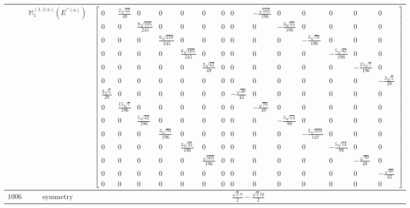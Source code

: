 \documentclass[fleqn,8pt,landscape]{jsarticle}
\begin{document}
\begin{longtable}{ccc}
$  $ & $ \mathbb{M}_{1}^{(1,1;a)}(E^{\prime\prime(a)}) $ & $ \begin{bmatrix} 0 & \frac{2 \sqrt{42}}{49} & 0 & 0 & 0 & 0 & 0 & 0 & - \frac{\sqrt{105}}{196} & 0 & 0 & 0 & 0 & 0 \\ 0 & 0 & \frac{8 \sqrt{105}}{245} & 0 & 0 & 0 & 0 & 0 & 0 & - \frac{3 \sqrt{35}}{196} & 0 & 0 & 0 & 0 \\ 0 & 0 & 0 & \frac{6 \sqrt{210}}{245} & 0 & 0 & 0 & 0 & 0 & 0 & - \frac{3 \sqrt{70}}{196} & 0 & 0 & 0 \\ 0 & 0 & 0 & 0 & \frac{8 \sqrt{105}}{245} & 0 & 0 & 0 & 0 & 0 & 0 & - \frac{5 \sqrt{42}}{196} & 0 & 0 \\ 0 & 0 & 0 & 0 & 0 & \frac{2 \sqrt{42}}{49} & 0 & 0 & 0 & 0 & 0 & 0 & - \frac{15 \sqrt{7}}{196} & 0 \\ 0 & 0 & 0 & 0 & 0 & 0 & 0 & 0 & 0 & 0 & 0 & 0 & 0 & - \frac{3 \sqrt{5}}{28} \\ \frac{3 \sqrt{5}}{28} & 0 & 0 & 0 & 0 & 0 & 0 & - \frac{\sqrt{30}}{42} & 0 & 0 & 0 & 0 & 0 & 0 \\ 0 & \frac{15 \sqrt{7}}{196} & 0 & 0 & 0 & 0 & 0 & 0 & - \frac{\sqrt{70}}{49} & 0 & 0 & 0 & 0 & 0 \\ 0 & 0 & \frac{5 \sqrt{42}}{196} & 0 & 0 & 0 & 0 & 0 & 0 & - \frac{5 \sqrt{14}}{98} & 0 & 0 & 0 & 0 \\ 0 & 0 & 0 & \frac{3 \sqrt{70}}{196} & 0 & 0 & 0 & 0 & 0 & 0 & - \frac{2 \sqrt{210}}{147} & 0 & 0 & 0 \\ 0 & 0 & 0 & 0 & \frac{3 \sqrt{35}}{196} & 0 & 0 & 0 & 0 & 0 & 0 & - \frac{5 \sqrt{14}}{98} & 0 & 0 \\ 0 & 0 & 0 & 0 & 0 & \frac{\sqrt{105}}{196} & 0 & 0 & 0 & 0 & 0 & 0 & - \frac{\sqrt{70}}{49} & 0 \\ 0 & 0 & 0 & 0 & 0 & 0 & 0 & 0 & 0 & 0 & 0 & 0 & 0 & - \frac{\sqrt{30}}{42} \\ 0 & 0 & 0 & 0 & 0 & 0 & 0 & 0 & 0 & 0 & 0 & 0 & 0 & 0 \end{bmatrix} $ \\ \hline
$ 1006 $ & $ \text{symmetry} $ & $ \frac{\sqrt{2} x}{2} - \frac{\sqrt{2} i y}{2} $ \\

\end{longtable}
\end{document}
